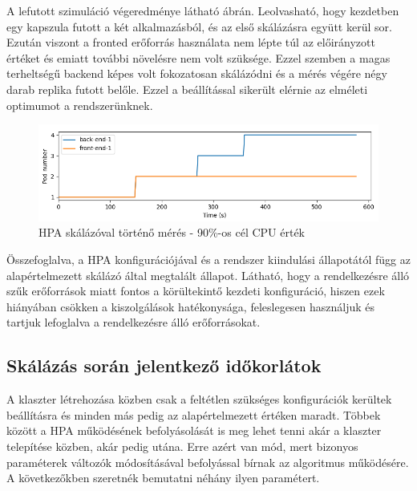 A lefutott szimuláció végeredménye látható  ábrán.
Leolvasható, hogy kezdetben egy kapszula futott a két alkalmazásból, és az első skálázásra együtt kerül sor.
Ezután viszont a fronted erőforrás használata nem lépte túl az előirányzott értéket és emiatt további növelésre nem volt szüksége.
Ezzel szemben a magas terheltségű backend képes volt fokozatosan skálázódni és a mérés végére négy darab replika futott belőle.
Ezzel a beállítással sikerült elérnie az elméleti optimumot a rendszerünknek.

\begin{figure}[!ht]
	\centering
	\includegraphics[width=150mm, keepaspectratio]{figures/HPA-scaling-in-the-same-time_90_percent_2_label.png}
	\caption{HPA skálázóval történő mérés - 90\%-os cél CPU érték}
	\label{fig:HPA-scaling-in-the-same-time_90_percent}
\end{figure}

Összefoglalva, a HPA konfigurációjával és a rendszer kiindulási állapotától függ az alapértelmezett skálázó által megtalált állapot.
Látható, hogy a rendelkezésre álló szűk erőforrások miatt fontos a körültekintő kezdeti konfiguráció, hiszen ezek hiányában csökken a kiszolgálások hatékonysága, feleslegesen használjuk és tartjuk lefoglalva a rendelkezésre álló erőforrásokat.

\subsection{Skálázás során jelentkező időkorlátok}
A klaszter létrehozása közben csak a feltétlen szükséges konfigurációk kerültek beállításra és minden más pedig az alapértelmezett értéken maradt.
Többek között a HPA működésének befolyásolását is meg lehet tenni akár a klaszter telepítése közben, akár pedig utána.
Erre azért van mód, mert bizonyos paraméterek változók módosításával befolyással bírnak az algoritmus működésére\citep{kubernetesHPADocumentation}.
A következőkben szeretnék bemutatni néhány ilyen paramétert.

